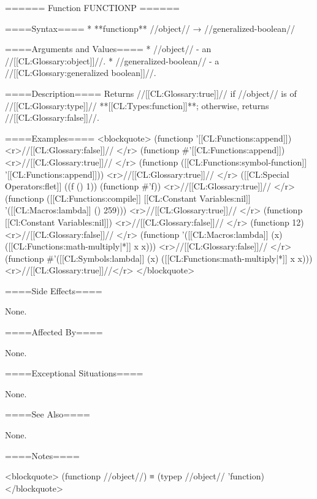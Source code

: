 ====== Function FUNCTIONP ======

====Syntax====
  * **functionp** //object// → //generalized-boolean//

====Arguments and Values====
  * //object// - an //[[CL:Glossary:object]]//.
  * //generalized-boolean// - a //[[CL:Glossary:generalized boolean]]//.

====Description====
Returns //[[CL:Glossary:true]]// if //object// is of //[[CL:Glossary:type]]// **[[CL:Types:function]]**; otherwise, returns //[[CL:Glossary:false]]//.

====Examples====
<blockquote>
(functionp '[[CL:Functions:append]]) <r>//[[CL:Glossary:false]]// </r>
(functionp #'[[CL:Functions:append]]) <r>//[[CL:Glossary:true]]// </r>
(functionp ([[CL:Functions:symbol-function]] '[[CL:Functions:append]])) <r>//[[CL:Glossary:true]]// </r>
([[CL:Special Operators:flet]] ((f () 1)) (functionp #'f)) <r>//[[CL:Glossary:true]]// </r>
(functionp ([[CL:Functions:compile]] [[CL:Constant Variables:nil]] '([[CL:Macros:lambda]] () 259))) <r>//[[CL:Glossary:true]]// </r>
(functionp [[Cl:Constant Variables:nil]]) <r>//[[CL:Glossary:false]]// </r>
(functionp 12) <r>//[[CL:Glossary:false]]// </r>
(functionp '([[CL:Macros:lambda]] (x) ([[CL:Functions:math-multiply|*]] x x))) <r>//[[CL:Glossary:false]]// </r>
(functionp #'([[CL:Symbols:lambda]] (x) ([[CL:Functions:math-multiply|*]] x x))) <r>//[[CL:Glossary:true]]//</r>
</blockquote>

====Side Effects====

None.

====Affected By====

None.

====Exceptional Situations====

None.

====See Also====

None.

====Notes====

<blockquote> (functionp //object//) ≡ (typep //object// 'function) </blockquote>

